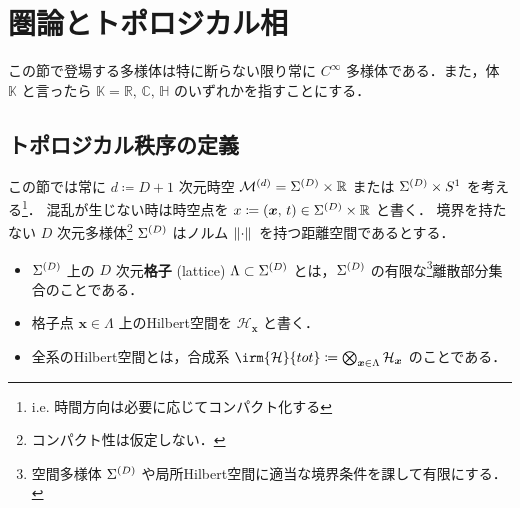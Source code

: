 \documentclass[TQFT_main]{subfiles}
\begin{document}
\setcounter{chapter}{3}

\chapter{圏論とトポロジカル相}

この節で登場する多様体は特に断らない限り常に $C^\infty$ 多様体である．また，体 $\mathbb{K}$ と言ったら $\mathbb{K} = \mathbb{R},\, \mathbb{C},\, \mathbb{H}$ のいずれかを指すことにする．

\section{トポロジカル秩序の定義}


この節では常に $d \coloneqq D+1$ 次元時空 $\mathcal{M}^{(d)} = \Sigma^{(D)} \times \mathbb{R}$ または $\Sigma^{(D)} \times S^1$ を考える\footnote{i.e. 時間方向は必要に応じてコンパクト化する}．
混乱が生じない時は時空点を $x \coloneqq (\bm{x},\, t) \in \Sigma^{(D)} \times \mathbb{R}$ と書く．
境界を持たない $D$ 次元多様体\footnote{コンパクト性は仮定しない．} $\Sigma^{(D)}$ はノルム $\norm*{\cdot}$ を持つ距離空間であるとする．

\begin{itemize}
    \item $\Sigma^{(D)}$ 上の $D$ 次元\textbf{格子} (lattice) $\Lambda \subset \Sigma^{(D)}$ とは，$\Sigma^{(D)}$ の有限な\footnote{空間多様体 $\Sigma^{(D)}$ や局所Hilbert空間に適当な境界条件を課して有限にする．}離散部分集合のことである．
    \item 格子点 $\bm{x} \in \Lambda$ 上のHilbert空間を $\mathcal{H}_{\bm{x}}$ と書く．
    \item 全系のHilbert空間とは，合成系 $\irm{\mathcal{H}}{tot} \coloneqq \bigotimes_{\bm{x} \in \Lambda} \mathcal{H}_{\bm{x}}$ のことである．
\end{itemize}
\end{document}

